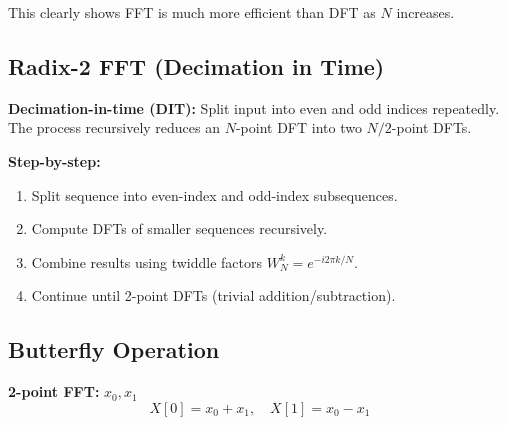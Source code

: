 \documentclass[a4paper,12pt]{article}
\begin{document}
This clearly shows FFT is much more efficient than DFT as $N$ increases.


\subsection{Radix-2 FFT (Decimation in Time)}

\textbf{Decimation-in-time (DIT):} Split input into even and odd indices repeatedly. The process recursively reduces an $N$-point DFT into two $N/2$-point DFTs.

\textbf{Step-by-step:}
\begin{enumerate}
    \item Split sequence into even-index and odd-index subsequences.
    \item Compute DFTs of smaller sequences recursively.
    \item Combine results using twiddle factors $W_N^k = e^{-i 2\pi k / N}$.
    \item Continue until 2-point DFTs (trivial addition/subtraction).
\end{enumerate}


\subsection{ Butterfly Operation}

\textbf{2-point FFT:} $x_0, x_1$  
\[
X[0] = x_0 + x_1, \quad X[1] = x_0 - x_1
\]

\begin{center}
\end{center}
\end{document}
